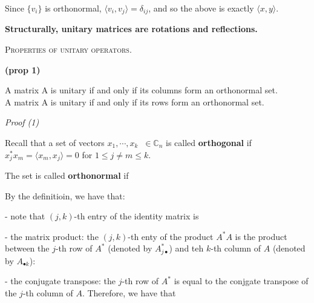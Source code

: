 \documentclass{article}
\begin{document}
Since $\lbrace v_i \rbrace$ is orthonormal, $\langle v_i, v_j \rangle = \delta_{ij} $, and so the above is exactly $\langle x,y \rangle$.



\textbf{Structurally, unitary matrices are rotations and reflections.}


\skl
\skl
\textsc{Properties of unitary operators.}

\textbf{(prop 1)} 

A matrix A is unitary if and only if its columns form an orthonormal set. \\
A matrix A is unitary if and only if its rows form an orthonormal set.

\textit{Proof (1)}

Recall that a set of vectors $x_1, \cdots , x_k \;\; \in \mathbb{C}_n$ is called \textbf{orthogonal} if
$x_j^* x_m = \langle x_m, x_j \rangle = 0$ for $1 \leq j \neq m \leq k$.

The set is called \textbf{orthonormal} if


By the definitioin, we have that:


- note that $(j,k)$-th entry of the identity matrix is


- the matrix product: the $(j,k)$-th enty of the product $A^*A$ is the product between the $j$-th row of $A^*$ (denoted by $A^*_{j\bullet}$) and teh $k$-th column of $A$ (denoted by $A_{\bullet k}$):


- the conjugate transpose: the $j$-th row of $A^*$ is equal to the conjgate transpose of the $j$-th column of $A$.
Therefore, we have that
\end{document}
